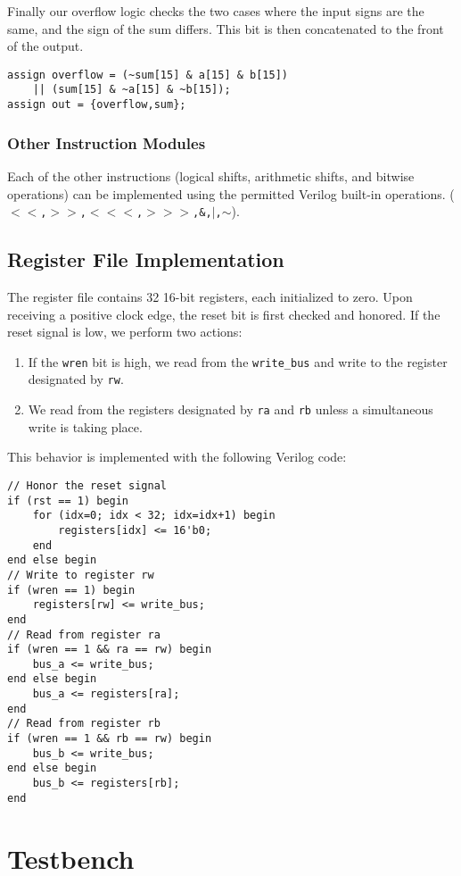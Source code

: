\documentclass[11pt]{article}
\begin{document}
Finally our overflow logic checks the two cases where the input signs are the same, and the sign of the sum differs. This bit is then concatenated to the front of the output.

\begin{lstlisting}
assign overflow = (~sum[15] & a[15] & b[15]) 
	|| (sum[15] & ~a[15] & ~b[15]);
assign out = {overflow,sum};
\end{lstlisting}

\subsubsection{Other Instruction Modules}
Each of the other instructions (logical shifts, arithmetic shifts, and bitwise operations) can be implemented using the permitted Verilog built-in operations. (\texttt{$<<$,$>>$,$<<<$,$>>>$,\&,$|$,$\sim$}).
\subsection{Register File Implementation}
The register file contains 32 16-bit registers, each initialized to zero. Upon receiving a positive clock edge, the reset bit is first checked and honored. If the reset signal is low, we perform two actions:
\begin{enumerate}
	\item If the \texttt{wren} bit is high, we read from the \texttt{write\_bus} and write to the register designated by \texttt{rw}.
	
	\item We read from the registers designated by \texttt{ra} and \texttt{rb} unless a simultaneous write is taking place.
\end{enumerate}

This behavior is implemented with the following Verilog code:
\begin{lstlisting}
// Honor the reset signal
if (rst == 1) begin
	for (idx=0; idx < 32; idx=idx+1) begin
		registers[idx] <= 16'b0;
	end
end else begin
// Write to register rw
if (wren == 1) begin
	registers[rw] <= write_bus;
end 
// Read from register ra
if (wren == 1 && ra == rw) begin
	bus_a <= write_bus;
end else begin
	bus_a <= registers[ra];
end
// Read from register rb
if (wren == 1 && rb == rw) begin
	bus_b <= write_bus;
end else begin
	bus_b <= registers[rb];
end
\end{lstlisting}

\section{Testbench}
\end{document}
